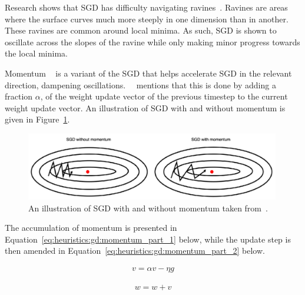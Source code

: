 Research shows that \acs{SGD} has difficulty navigating ravines~\cite{ref:sutton:1986}. Ravines are areas where the surface curves much more steeply in one dimension than in another. These ravines are common around local minima. As such, \acs{SGD} is shown to oscillate across the slopes of the ravine while only making minor progress towards the local minima.

\Acs{Momentum} ~\cite{ref:qian:1999} is a variant of the \acs{SGD} that helps accelerate \acs{SGD} in the relevant direction, dampening oscillations.~\citeauthor{ref:ruder:2016}~\cite{ref:ruder:2016} mentions that this is done by adding a fraction $\alpha$, of the weight update vector of the previous timestep to the current weight update vector. An illustration of \acs{SGD} with and without momentum is given in Figure~\ref{fig:heuristics:gd:sgd_with_and_without_momentum}.

\begin{figure}[htbp]
      \centering
      \includegraphics[width=0.99\textwidth]{images/sgd_with_and_without_momentum.pdf}
      \caption{An illustration of \acf{SGD} with and without momentum taken from~\cite{ref:du:2019}.}
      \label{fig:heuristics:gd:sgd_with_and_without_momentum}
\end{figure}

\noindent
The accumulation of momentum is presented in Equation~\eqref{eq:heuristics:gd:momentum_part_1} below, while the update step is then amended in Equation~\eqref{eq:heuristics:gd:momentum_part_2} below.

\begin{equation}
      \label{eq:heuristics:gd:momentum_part_1}
      \begin{split}
            v = \alpha v - \eta g
      \end{split}
\end{equation}

\begin{equation}
      \label{eq:heuristics:gd:momentum_part_2}
      \begin{split}
            w = w + v
      \end{split}
\end{equation}

